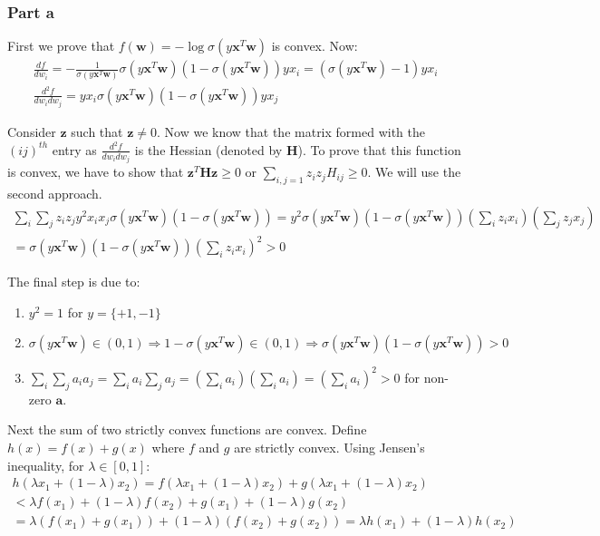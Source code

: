 \documentclass{article}
\newcommand{\vct}[1]{\mathbf{#1}}
\begin{document}
\subsubsection*{Part a}
\begin{flushleft}
First we prove that \(f(\vct{w}) = -\log \sigma(y \vct{x}^{T} \vct{w})\) is convex. Now:
\begin{gather}
\frac{df}{dw_{i}} = -\frac{1}{\sigma(y \vct{x}^{T}\vct{w})} \sigma(y \vct{x}^{T}\vct{w}) (1 - \sigma(y \vct{x}^{T}\vct{w})) yx_{i} = (\sigma(y \vct{x}^{T}\vct{w}) - 1) yx_{i}\\
\frac{d^{2}f}{dw_{i}dw_{j}} = yx_{i}\sigma(y \vct{x}^{T}\vct{w})(1 - \sigma(y \vct{x}^{T}\vct{w}))yx_{j}
\end{gather}

Consider \(\vct{z}\) such that \(\vct{z} \neq 0\). Now we know that the matrix formed with the \((ij)^{th}\) entry as \(\frac{d^{2}f}{dw_{i}dw_{j}}\) is the Hessian (denoted by \(\vct{H}\)). To prove that this function is convex, we have to show that \(\vct{z}^{T}\vct{H}\vct{z} \geq 0\) or \(\displaystyle\sum_{i, j = 1} z_{i}z_{j}H_{ij} \geq 0\). We will use the second approach.
\begin{multline}
\sum_{i}\sum_{j} z_{i}z_{j}y^{2}x_{i}x_{j}\sigma(y \vct{x}^{T}\vct{w})(1 - \sigma(y \vct{x}^{T}\vct{w})) = y^{2}\sigma(y \vct{x}^{T}\vct{w})(1 - \sigma(y \vct{x}^{T}\vct{w}))\left(\sum_{i}z_{i}x_{i}\right)\left(\sum_{j}z_{j}x_{j}\right)\\= \sigma(y \vct{x}^{T}\vct{w})(1 - \sigma(y \vct{x}^{T}\vct{w})) \left(\sum_{i} z_{i}x_{i}\right)^{2} > 0
\end{multline}

The final step is due to:
\begin{enumerate}
\item \(y^{2} = 1\) for \(y = \{+1, -1\}\)
\item \(\sigma(y \vct{x}^{T}\vct{w}) \in (0, 1) \Rightarrow 1 - \sigma(y \vct{x}^{T}\vct{w}) \in (0, 1) \Rightarrow \sigma(y \vct{x}^{T}\vct{w})(1 - \sigma(y \vct{x}^{T}\vct{w})) > 0\)
\item \(\displaystyle\sum_{i}\sum_{j} a_{i}a_{j} = \sum_{i}a_{i}\sum_{j}a_{j} = \left(\sum_{i}a_{i}\right)\left(\sum_{i}a_{i}\right) = \left(\sum_{i}a_{i}\right)^{2} > 0\) for non-zero \(\vct{a}\).
\end{enumerate}

Next the sum of two strictly convex functions are convex. Define \(h(x) = f(x) + g(x)\) where \(f\) and \(g\) are strictly convex. Using Jensen's inequality, for \(\lambda \in [0, 1]\):
\begin{multline}
h(\lambda x_{1} + (1 - \lambda)x_{2}) = f(\lambda x_{1} + (1 - \lambda)x_{2}) + g(\lambda x_{1} + (1 - \lambda)x_{2})\\< \lambda f(x_{1}) + (1 - \lambda)f(x_{2}) + g(x_{1}) + (1 - \lambda)g(x_{2})\\= \lambda(f(x_{1}) + g(x_{1})) + (1 - \lambda)(f(x_{2}) + g(x_{2}))=\lambda h(x_{1}) + (1 - \lambda)h(x_{2})
\end{multline}


\end{flushleft}
\end{document}
